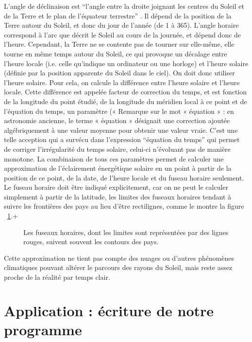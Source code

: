 \documentclass[12pt]{article}
\begin{document}
L'angle de déclinaison est ``l'angle entre la droite joignant les centres du Soleil et de la Terre et le plan de l'équateur terrestre'' \cite{mouvement_terre}. Il dépend de la position de la Terre autour du Soleil, et donc du jour de l'année (de 1 à 365).
L'angle horaire correspond à l'arc que décrit le Soleil au cours de la journée, et dépend donc de l'heure. Cependant, la Terre ne se contente pas de tourner sur elle-même, elle tourne en même temps autour du Soleil, ce qui provoque un décalage entre l'heure locale (i.e. celle qu'indique un ordinateur ou une horloge) et l'heure solaire (définie par la position apparente du Soleil dans le ciel). On doit donc utiliser l'heure solaire.
Pour cela, on calcule la différence entre l'heure solaire et l'heure locale. Cette différence est appelée facteur de correction du temps, et est fonction de la longitude du point étudié, de la longitude du méridien local à ce point et de l'équation du temps, un paramètre (« Remarque sur le mot « équation » : en astronomie ancienne, le terme « équation » désignait une correction ajoutée algébriquement à une valeur moyenne pour obtenir une valeur vraie. C'est une telle acception qui a survécu dans l'expression ``équation du temps'' \cite{equation_temps_wiki} qui permet de corriger l'irrégularité du temps solaire, celui-ci n'évoluant pas de manière monotone. %
La combinaison de tous ces paramètres permet de calculer une approximation de l'éclairement énergétique solaire en un point à partir de la position de ce point, de la date, de l'heure locale et du fuseau horaire seulement. Le fuseau horaire doit être indiqué explicitement, car on ne peut le calculer simplement à partir de la latitude, les limites des fuseaux horaires tendant à suivre les frontières des pays au lieu d'être rectilignes, comme le montre la figure ~\ref{fig:timezones}.+

\begin{figure}[!ht]
  \centering
  \caption{Les fuseaux horaires, dont les limites sont représentées par des lignes rouges, suivent souvent les contours des pays.}
  \label{fig:timezones}
\end{figure}

Cette approximation ne tient pas compte des nuages ou d'autres phénomènes climatiques pouvant altérer le parcours des rayons du Soleil, mais reste assez proche de la réalité par temps clair.


\clearpage
\section{Application : écriture de notre programme}
\end{document}
